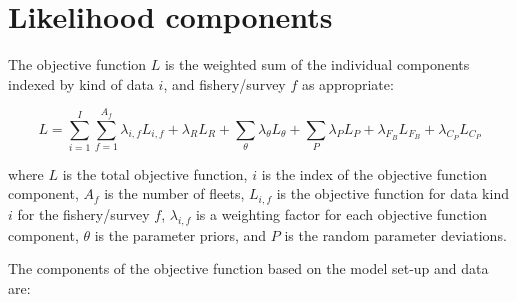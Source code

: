 \section{Likelihood components}

The objective function $L$ is the weighted sum of the individual components
indexed by kind of data $i$, and fishery/survey $f$ as appropriate:

\begin{equation}
	L = \sum_{i=1}^{I}\sum_{f=1}^{A_f}\lambda_{i,f} L_{i,f}+\lambda_R L_R + 
	  \sum_{\theta}^{}\lambda_\theta L_\theta + \sum_{P}^{}\lambda_P L_P +
	  \lambda_{F_B} L_{F_B} + \lambda_{C_P} L_{C_P}
\end{equation}

where $L$ is the total objective function, $i$ is the index of the objective
function component, $A_f$ is the number of fleets, $L_{i,f}$ is the
objective function for data kind $i$ for the fishery/survey $f$,
$\lambda_{i,f}$ is a weighting factor for each objective function component,
$\theta$ is the parameter priors, and $P$ is the random parameter deviations.

The components of the objective function based on the model set-up and data are: 

